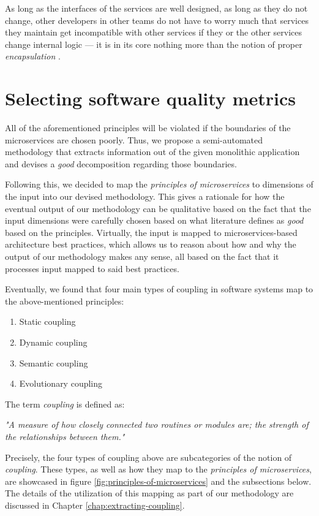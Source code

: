 \documentclass[12pt,a4paper]{report}
\begin{document}
As long as the interfaces of the services are well designed, as long as they do
not change, other developers in other teams do not have to worry much that
services they maintain get incompatible with other services if they or the
other services change internal logic --- it is in its core nothing more than
the notion of proper \textit{encapsulation} \cite{ms-fowler}.



\section{Selecting software quality metrics} \label{sect:software-quality-metrics}

All of the aforementioned principles will be violated if the boundaries of the
microservices are chosen poorly. Thus, we propose a semi-automated methodology
that extracts information out of the given monolithic application and devises a
\textit{good} decomposition regarding those boundaries.

Following this, we decided to map the \textit{principles of microservices} to
dimensions of the input into our devised methodology. This gives a rationale
for how the eventual output of our methodology can be qualitative based on the
fact that the input dimensions were carefully chosen based on what literature
defines as \textit{good} based on the principles. Virtually, the input is
mapped to microservices-based architecture best practices, which allows us to
reason about how and why the output of our methodology makes any sense, all
based on the fact that it processes input mapped to said best practices.

Eventually, we found that four main types of coupling in software systems map
to the above-mentioned principles:
\begin{enumerate}
  \item Static coupling
  \item Dynamic coupling
  \item Semantic coupling
  \item Evolutionary coupling
\end{enumerate} The term \textit{coupling} is defined as:
\begin{displayquote}
  \emph{
  "A measure of how closely connected two routines or modules are;
  the strength of the relationships between them."
  }~\cite{swebok}
\end{displayquote}
Precisely, the four types of coupling above are subcategories of the notion of
\textit{coupling}. These types, as well as how they map to the
\textit{principles of microservices}, are showcased in figure
\ref{fig:principles-of-microservices} and the subsections below.
The details of the utilization of this mapping as part of
our methodology are discussed in Chapter \ref{chap:extracting-coupling}.
\end{document}
